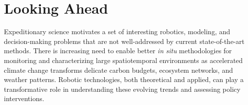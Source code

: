 \section{Looking Ahead}
Expeditionary science motivates a set of interesting robotics, modeling, and decision-making problems that are not well-addressed by current state-of-the-art methods. There is increasing need to enable better \emph{in situ} methodologies for monitoring and characterizing large spatiotemporal environments as accelerated climate change transforms delicate carbon budgets, ecosystem networks, and weather patterns. Robotic technologies, both theoretical and applied, can play a transformative role in understanding these evolving trends and assessing policy interventions. %


